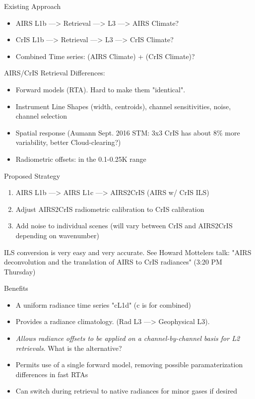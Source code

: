 \documentclass[10pt,t]{beamer}
\begin{document}
\begin{frame}[label={sec:orga95dadf}]{Existing Approach}
\begin{itemize}
\item AIRS L1b ---> Retrieval ---> L3 ---> AIRS Climate?
\item CrIS L1b ---> Retrieval ---> L3 ---> CrIS Climate?
\item Combined Time series: (AIRS Climate) + (CrIS Climate)?
\end{itemize}

\begin{block}{AIRS/CrIS Retrieval Differences:}
\begin{itemize}
\item Forward models (RTA).  Hard to make them "identical".
\item Instrument Line Shapes (width, centroids), channel sensitivities, noise, channel selection
\item Spatial response (Aumann Sept. 2016 STM: 3x3 CrIS has about 8\% more variability, better Cloud-clearing?)
\item Radiometric offsets: in the 0.1-0.25K range
\end{itemize}
\end{block}
\end{frame}

\begin{frame}[squeeze=2]{Proposed Strategy}
\begin{enumerate}
\item AIRS L1b ---> AIRS L1c ---> AIRS2CrIS (AIRS w/ CrIS ILS)
\item Adjust AIRS2CrIS radiometric calibration to CrIS calibration
\item Add noise to individual scenes (will vary between CrIS and AIRS2CrIS depending on wavenumber)
\end{enumerate}
\footnotesize
ILS conversion is very easy and very accurate. See Howard Mottelers talk: "AIRS deconvolution and the translation of AIRS to CrIS radiances" (3:20 PM Thursday)

\normalsize
\begin{block}{Benefits}
\begin{itemize}
\item A uniform radiance time series "cL1d" (c is for combined)
\item Provides a radiance climatology.  (Rad L3 ---> Geophysical L3).
\item \emph{Allows radiance offsets to be applied on a channel-by-channel basis for L2 retrievals}.  What is the alternative?
\item Permits use of a single forward model, removing possible paramaterization differences in fast RTAs
\item Can switch during retrieval to native radiances for minor gases if desired
\end{itemize}
\end{block}
\end{frame}
\end{document}
